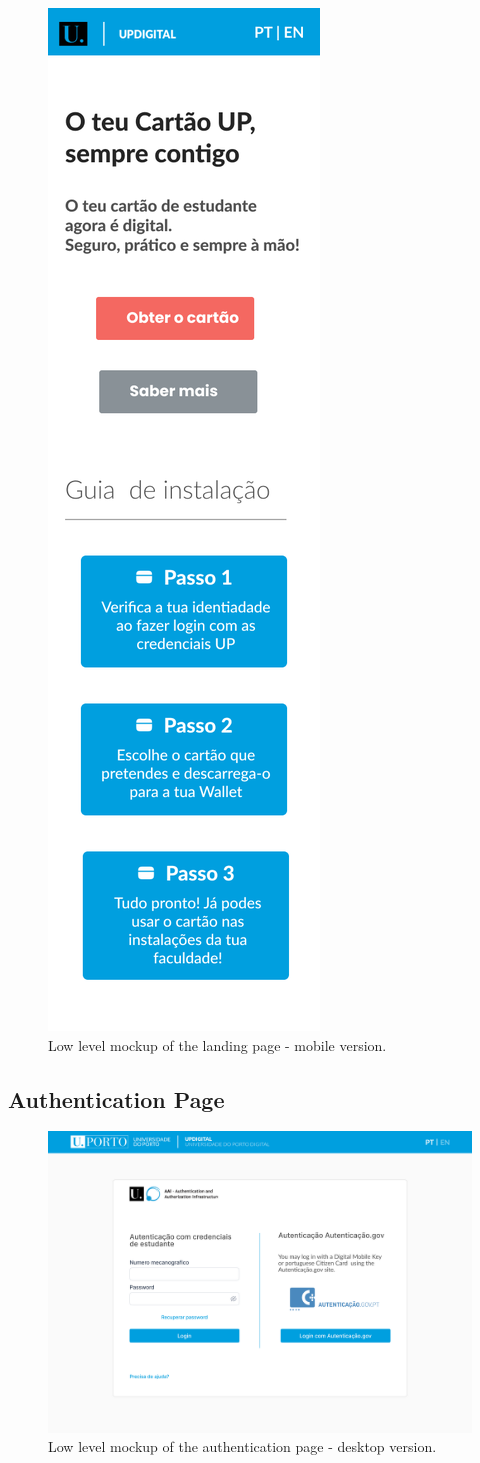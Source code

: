 \documentclass[10pt]{article}
\begin{document}
\begin{figure}[H]
  \centering
  \includegraphics[width=0.25\linewidth]{report-images/landing-page-mobile.png}
  \caption{Low level mockup of the landing page - mobile version.}
  \label{fig:fig-9}
\end{figure}

\clearpage %

\subsection{Authentication Page}

\begin{figure}[H]
  \centering
  \includegraphics[width=1\linewidth]{report-images/authentication-page-desktop.png}
  \caption{Low level mockup of the authentication page - desktop version.}
  \label{fig:fig-10}
\end{figure}
\end{document}
